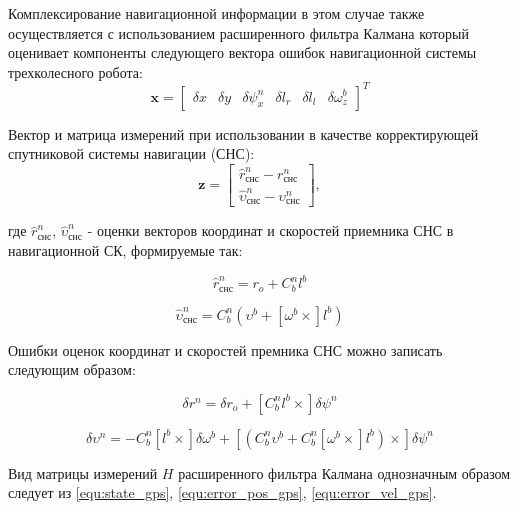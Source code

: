 \documentclass[14pt]{article}
\begin{document}
Комплексирование навигационной информации в этом случае также осуществляется с использованием расширенного фильтра Калмана который оценивает компоненты следующего вектора ошибок навигационной системы трехколесного робота:
\begin{equation}
 \mathbf x = \begin{bmatrix}\delta x & \delta y & \delta\psi^n_x & \delta l_r & \delta l_l & \delta\omega^b_z  \end{bmatrix}^T
 \label{equ:state_gps}
 \end{equation}
   
Вектор и матрица измерений при использовании в качестве корректирующей спутниковой системы навигации (СНС):
\begin{equation}
 \mathbf z = \begin{bmatrix} {\hat r}^n_{снс} - r^n_{снс} \\ {\hat \upsilon}^n_{снс} - \upsilon^n_{снс} \end{bmatrix},
 \end{equation}
 
 где ${\hat r}^n_{снс}$, ${\hat \upsilon}^n_{снс}$ - оценки векторов координат и скоростей приемника СНС в навигационной СК, формируемые так:
 
 \begin{equation}
  {\hat r}^n_{снс} = r_o + C_b^n l^b
 \end{equation}
 
 \begin{equation}
  {\hat \upsilon}^n_{снс} =  C_b^n \left(\upsilon^b + \left[\omega^b\times\right] l^b\right)
 \end{equation}
 
 Ошибки оценок координат и скоростей премника СНС можно записать следующим образом:
 
 \begin{equation}
  \delta r^n = \delta r_o  +  \left[ C_b^n l^b \times \right]\delta\psi^n 
  \label{equ:error_pos_gps}
 \end{equation}
   
 \begin{equation}
  \delta\upsilon^n = - C_b^n \left[l^b\times\right]\delta\omega^b + \left[\left(C_b^n\upsilon^b+C_b^n\left[\omega^b\times\right] l^b\right)\times\right]\delta\psi^n 
  \label{equ:error_vel_gps}
 \end{equation}

Вид матрицы измерений $H$ расширенного фильтра Калмана однозначным образом следует из \eqref{equ:state_gps},  \eqref{equ:error_pos_gps}, \eqref{equ:error_vel_gps}.
\end{document}
